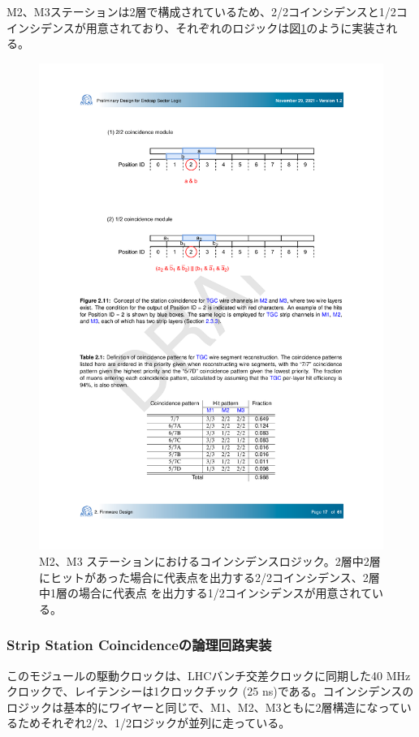 M2、M3ステーションは2層で構成されているため、2/2コインシデンスと1/2コインシデンスが用意されており、それぞれのロジックは図\ref{StationCoin_Doublet}のように実装される。
    
\begin{figure} 
\centering
\includegraphics[width=16cm]{fig/SL/StationCoin_doublet.pdf}
\caption[M2・M3 ステーションにおけるコインシデンスロジック]{M2、M3 ステーションにおけるコインシデンスロジック\cite{SLPDR}。2層中2層にヒットがあった場合に代表点を出力する2/2コインシデンス、2層中1層の場合に代表点
を出力する1/2コインシデンスが用意されている。}
\label{StationCoin_Doublet}
\end{figure}


\subsubsection*{Strip Station Coincidenceの論理回路実装}
このモジュールの駆動クロックは、LHCバンチ交差クロックに同期した40 MHzクロックで、レイテンシーは1クロックチック (25 ns)である。コインシデンスのロジックは基本的にワイヤーと同じで、M1、M2、M3ともに2層構造になっているためそれぞれ2/2、1/2ロジックが並列に走っている。


